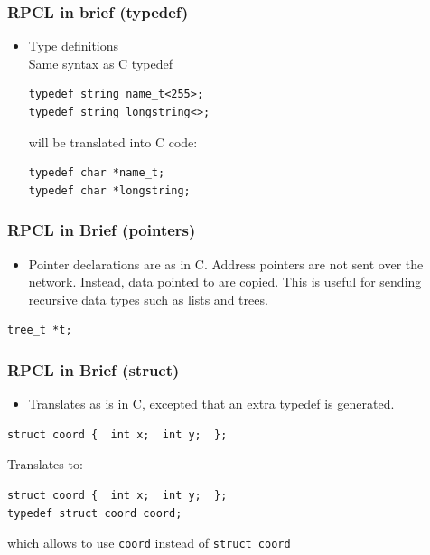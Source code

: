 \documentclass[bigger,hyperref={colorlinks=true, urlcolor=red, plainpages=false, pdfpagelabels, bookmarksnumbered}]{beamer}
\begin{document}
\begin{frame}[fragile]
\frametitle{RPCL in brief (typedef)}
\label{sec-2-20}
\begin{itemize}

\item Type definitions\\
\label{sec-2-20-1}%
Same syntax as C typedef

\lstset{language=C}
\begin{lstlisting}
typedef string name_t<255>; 
typedef string longstring<>;
\end{lstlisting}
will be translated into C code:

\lstset{language=C}
\begin{lstlisting}
typedef char *name_t;
typedef char *longstring;
\end{lstlisting}

\end{itemize} %
\end{frame}
\begin{frame}[fragile]
\frametitle{RPCL in Brief (pointers)}
\label{sec-2-21}

\begin{itemize}
\item Pointer declarations are as in C. Address pointers are not sent over the network. 
     Instead, data pointed to are copied. This is useful for sending recursive data 
     types such as lists and trees.
\end{itemize}

\lstset{language=C}
\begin{lstlisting}
tree_t *t;
\end{lstlisting}
\end{frame}
\begin{frame}[fragile]
\frametitle{RPCL in Brief (struct)}
\label{sec-2-22}

\begin{itemize}
\item Translates as is in C, excepted that an extra typedef is generated.
\end{itemize}

\lstset{language=C}
\begin{lstlisting}
struct coord {  int x;  int y;  };
\end{lstlisting}
Translates to:

\lstset{language=C}
\begin{lstlisting}
struct coord {  int x;  int y;  };
typedef struct coord coord;
\end{lstlisting}
which allows to use \texttt{coord} instead of \texttt{struct coord}
\end{frame}
\end{document}
